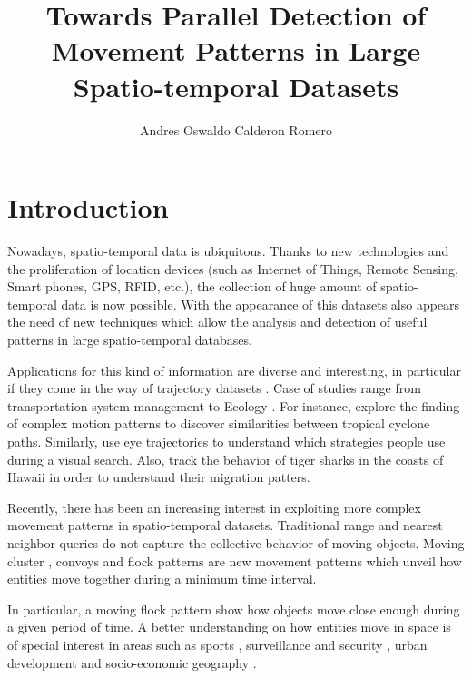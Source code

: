\documentclass[12pt]{scrartcl}
\title{Towards Parallel Detection of Movement Patterns in Large Spatio-temporal Datasets}
\author{Andres Oswaldo Calderon Romero}
\begin{document}
\maketitle
 
\section{Introduction}
Nowadays, spatio-temporal data is ubiquitous. Thanks to new technologies and the proliferation of location devices (such as Internet of Things, Remote Sensing, Smart phones, GPS, RFID, etc.), the collection of huge amount of spatio-temporal data is now possible. With the appearance of this datasets also appears the need of new techniques which allow the analysis and detection of useful patterns in large spatio-temporal databases.  

Applications for this kind of information are diverse and interesting, in particular if they come in the way of trajectory datasets \citep{jeung_trajectory_2011, huang_mining_2015}. Case of studies range from transportation system management \citep{di_lorenzo_allaboard:_2016,johansson_efficiency_2015} to Ecology \citep{johnston_abundance_2015, la_sorte_convergence_2016}.  For instance, \cite{turdukulov_visual_2014} explore the finding of complex motion patterns to discover similarities between tropical cyclone paths.  Similarly, \cite{amor_persistence_2016} use eye trajectories to understand which strategies people use during a visual search. Also, \cite{holland_movements_1999} track the behavior of tiger sharks in the coasts of Hawaii in order to understand their migration patters.

Recently, there has been an increasing interest in exploiting more complex movement patterns in spatio-temporal datasets.  Traditional range and nearest neighbor queries do not capture the collective behavior of moving objects.  Moving cluster \citep{kalnis_discovering_2005}, convoys \citep{jeung_discovery_2008} and flock patterns \citep{benkert_reporting_2008, gudmundsson_computing_2006} are new movement patterns which unveil how entities move together during a minimum time interval.  

In particular, a moving flock pattern show how objects move close enough during a given period of time.  A better understanding on how entities move in space is of special interest in areas such as sports \citep{iwase_tracking_2002},  surveillance and security \citep{makris_path_2002,piciarelli_trajectory_2005}, urban development \citep{huang_trajgraph:_2016, long_combining_2015} and socio-economic geography \citep{frank_life_2000}.
\end{document}
